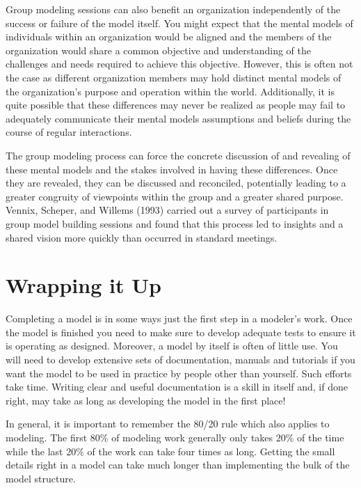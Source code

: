 \documentclass[]{memoir}
\begin{document}
Group modeling sessions can also benefit an organization independently
of the success or failure of the model itself. You might expect that the
mental models of individuals within an organization would be aligned and
the members of the organization would share a common objective and
understanding of the challenges and needs required to achieve this
objective. However, this is often not the case as different organization
members may hold distinct mental models of the organization's purpose
and operation within the world. Additionally, it is quite possible that
these differences may never be realized as people may fail to adequately
communicate their mental models assumptions and beliefs during the
course of regular interactions.

The group modeling process can force the concrete discussion of and
revealing of these mental models and the stakes involved in having these
differences. Once they are revealed, they can be discussed and
reconciled, potentially leading to a greater congruity of viewpoints
within the group and a greater shared purpose. Vennix, Scheper, and
Willems (1993) carried out a survey of participants in group model
building sessions and found that this process led to insights and a
shared vision more quickly than occurred in standard meetings.

\section{Wrapping it Up}

Completing a model is in some ways just the first step in a modeler's
work. Once the model is finished you need to make sure to develop
adequate tests to ensure it is operating as designed. Moreover, a model
by itself is often of little use. You will need to develop extensive
sets of documentation, manuals and tutorials if you want the model to be
used in practice by people other than yourself. Such efforts take time.
Writing clear and useful documentation is a skill in itself and, if done
right, may take as long as developing the model in the first place!

In general, it is important to remember the 80/20 rule which also
applies to modeling. The first 80\% of modeling work generally only
takes 20\% of the time while the last 20\% of the work can take four
times as long. Getting the small details right in a model can take much
longer than implementing the bulk of the model structure.

\paragraph{}
\end{document}
